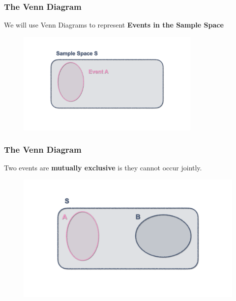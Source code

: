 \documentclass[notes=show]{beamer}\usepackage[]{graphicx}\usepackage[]{color}
\begin{document}
\begin{frame}
\frametitle{The Venn Diagram}

We will use Venn Diagrams to represent \textbf{Events in the Sample Space}

\begin{figure}[h!]
\centering
\includegraphics[width=0.8\textwidth,height=0.6\textheight]{img/charts/charts.002.png}
\end{figure}
\end{frame}



\begin{frame}
\frametitle{The Venn Diagram}


Two events are \textbf{mutually exclusive} is they cannot occur jointly.

\begin{figure}[h!]
\centering
\includegraphics[width=1\textwidth,height=0.7\textheight]{img/charts/charts.003.png}
\end{figure}
\end{frame}
\end{document}
